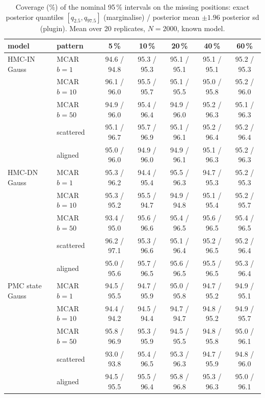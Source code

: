 \begin{table}[htbp]
  \centering
  \small
  \setlength{\tabcolsep}{4pt}
  \caption{Coverage (\%) of the nominal 95\,\% intervals on the missing positions: exact posterior quantiles $[q_{2.5}, q_{97.5}]$ (marginalise) / posterior mean $\pm 1.96$ posterior sd (plugin). Mean over 20 replicates, $N = 2000$, known model.}
  \label{tab:missing-cov95}
  \begin{tabular}{llccccc}
    \toprule
    model & pattern & 5\,\% & 10\,\% & 20\,\% & 40\,\% & 60\,\% \\
    \midrule
    HMC-IN Gauss & MCAR $b{=}1$ & 94.6 / 94.8 & 95.3 / 95.3 & 95.1 / 95.1 & 95.1 / 95.1 & 95.2 / 95.3 \\
     & MCAR $b{=}10$ & 96.1 / 96.0 & 95.5 / 95.7 & 95.1 / 95.5 & 95.0 / 95.8 & 95.2 / 96.0 \\
     & MCAR $b{=}50$ & 94.9 / 96.0 & 95.4 / 96.4 & 94.9 / 96.0 & 95.2 / 96.3 & 95.1 / 96.3 \\
     & scattered & 95.1 / 96.7 & 95.7 / 96.9 & 95.1 / 96.1 & 95.2 / 96.4 & 95.2 / 96.4 \\
     & aligned & 95.0 / 96.0 & 94.9 / 96.0 & 94.9 / 96.1 & 95.1 / 96.3 & 95.2 / 96.3 \\
    \addlinespace
    HMC-DN Gauss & MCAR $b{=}1$ & 95.3 / 96.2 & 94.4 / 95.4 & 95.5 / 96.3 & 94.7 / 95.3 & 95.2 / 95.3 \\
     & MCAR $b{=}10$ & 95.3 / 95.2 & 95.5 / 94.7 & 94.9 / 94.8 & 95.1 / 95.4 & 95.2 / 95.7 \\
     & MCAR $b{=}50$ & 93.4 / 95.0 & 95.6 / 96.6 & 95.4 / 96.5 & 95.6 / 96.5 & 95.4 / 96.5 \\
     & scattered & 96.2 / 97.1 & 95.3 / 96.6 & 95.1 / 96.4 & 95.2 / 96.5 & 95.2 / 96.4 \\
     & aligned & 95.0 / 95.6 & 95.7 / 96.5 & 95.6 / 96.5 & 95.5 / 96.5 & 95.3 / 96.4 \\
    \addlinespace
    PMC state Gauss & MCAR $b{=}1$ & 94.5 / 95.5 & 94.7 / 95.9 & 95.0 / 95.8 & 94.7 / 95.2 & 94.9 / 95.1 \\
     & MCAR $b{=}10$ & 94.4 / 94.2 & 94.5 / 94.4 & 94.7 / 94.7 & 94.8 / 95.2 & 94.9 / 95.7 \\
     & MCAR $b{=}50$ & 95.8 / 96.9 & 95.3 / 95.9 & 94.5 / 95.5 & 94.8 / 95.8 & 95.0 / 96.1 \\
     & scattered & 93.0 / 93.8 & 95.4 / 96.5 & 95.3 / 96.3 & 94.7 / 95.9 & 94.8 / 96.0 \\
     & aligned & 94.5 / 95.5 & 95.5 / 96.4 & 95.8 / 96.8 & 95.3 / 96.3 & 95.0 / 96.1 \\

\end{tabular}
\end{table}
